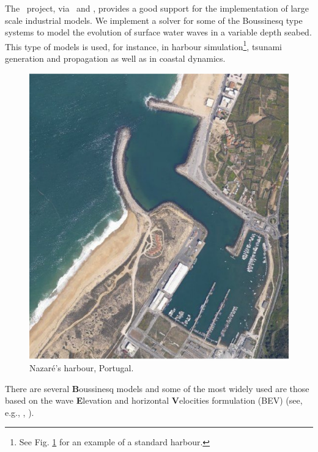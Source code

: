 The \fenics\, project, via \dolfin\, and \ffc, provides a good
support for the implementation of large scale industrial models.  We
implement a solver for some of the Boussinesq type systems to model
the evolution of surface water waves in a variable
depth seabed.  This type of models is used, for instance, in harbour
simulation\footnote{See Fig. \ref{lopes:fig:harbour} for an example of a
standard harbour.}, tsunami generation and propagation as well as in
coastal dynamics.
\begin{figure}[!htb]
\centering
\includegraphics[width=\smallfig]{chapters/lopes/pdf/nazare1.pdf}
\caption{Nazar\'{e}'s harbour, Portugal.}\label{lopes:fig:harbour}
\end{figure}


There are several {\bf B}oussinesq models and some of the most widely
used are those based on the wave {\bf E}levation and horizontal {\bf
V}elocities formulation (BEV) (see, e.g., \cite{LiuWoo2004},
\cite{WalkleyBerzins2002}).


